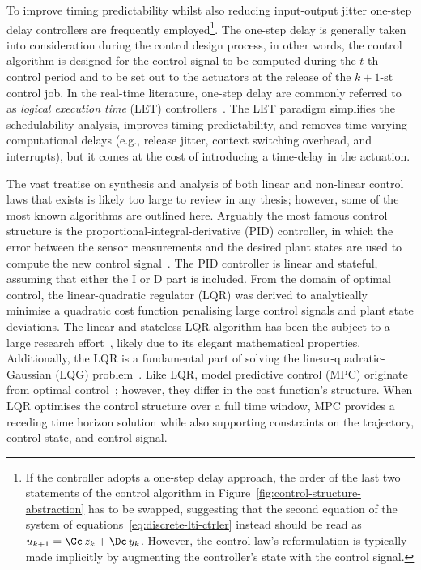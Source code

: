 To improve timing predictability whilst also reducing input-output jitter one-step delay controllers are frequently employed\footnote{If the controller adopts a one-step delay approach, the order of the last two statements of the control algorithm in Figure~\ref{fig:control-structure-abstraction} has to be swapped, suggesting that the second equation of the system of equations~\eqref{eq:discrete-lti-ctrler} instead should be read as $u_{k+1} = \Cc\,z_k+\Dc\,y_k$. However, the control law's reformulation is typically made implicitly by augmenting the controller's state with the control signal.}.
The one-step delay is generally taken into consideration during the control design process, in other words, the control algorithm is designed for the control signal to be computed during the $t$-th control period and to be set out to the actuators at the release of the $k+1$-st control job.
In the real-time literature, one-step delay are commonly referred to as \emph{logical execution time} (LET) controllers~\cite{Ernst:2018, Gemlau:2021, Kirsch:2012}.
The LET paradigm simplifies the schedulability analysis, improves timing predictability, and removes time-varying computational delays (e.g., release jitter, context switching overhead, and interrupts), but it comes at the cost of introducing a time-delay in the actuation.

The vast treatise on synthesis and analysis of both linear and non-linear control laws that exists is likely too large to review in any thesis; however, some of the most known algorithms are outlined here.
Arguably the most famous control structure is the proportional-integral-derivative (PID) controller, in which the error between the sensor measurements and the desired plant states are used to compute the new control signal~\cite{Astrom:2006}.
The PID controller is linear and stateful, assuming that either the I or D part is included.
From the domain of optimal control, the linear-quadratic regulator (LQR) was derived to analytically minimise a quadratic cost function penalising large control signals and plant state deviations.
The linear and stateless LQR algorithm has been the subject to a large research effort~\addref{}, likely due to its elegant mathematical properties.
Additionally, the LQR is a fundamental part of solving the linear-quadratic-Gaussian (LQG) problem~\addref{}.
Like LQR, model predictive control (MPC) originate from optimal control~\addref{}; however, they differ in the cost function's structure.
When LQR optimises the control structure over a full time window, MPC provides a receding time horizon solution while also supporting constraints on the trajectory, control state, and control signal.

